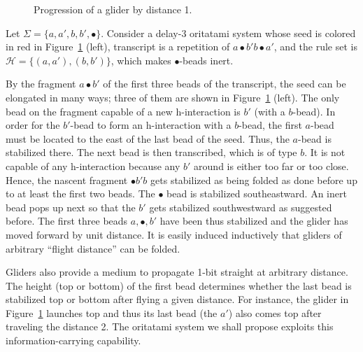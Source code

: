 \begin{figure}[htb]
{}
\caption{Progression of a glider by distance 1.}
\label{fig:glider}
\end{figure}


\begin{example}\label{ex:glider}
Let $\Sigma = \{a, a', b, b', \bullet\}$. 
Consider a delay-3 oritatami system whose seed is colored in red in Figure~\ref{fig:glider} (left), transcript is a repetition of $a \bullet b' b \bullet a'$, and the rule set is $\mathcal{H} = \{(a, a'), (b, b')\}$, which makes $\bullet$-beads inert. 

By the fragment $a \bullet b'$ of the first three beads of the transcript, the seed can be elongated in many ways; three of them are shown in Figure~\ref{fig:glider} (left). 
The only bead on the fragment capable of a new h-interaction is $b'$ (with a $b$-bead).
In order for the $b'$-bead to form an h-interaction with a $b$-bead, the first $a$-bead must be located to the east of the last bead of the seed. 
Thus, the $a$-bead is stabilized there. 
The next bead is then transcribed, which is of type $b$.
It is not capable of any h-interaction because any $b'$ around is either too far or too close.  
Hence, the nascent fragment $\bullet b' b$ gets stabilized as being folded as done before up to at least the first two beads. 
The $\bullet$ bead is stabilized southeastward. 
An inert bead pops up next so that the $b'$ gets stabilized southwestward as suggested before. 
The first three beads $a, \bullet, b'$ have been thus stabilized and the glider has moved forward by unit distance. 
It is easily induced inductively that gliders of arbitrary ``flight distance'' can be folded. 


Gliders also provide a medium to propagate 1-bit straight at arbitrary distance. 
The height (top or bottom) of the first bead determines whether the last bead is stabilized top or bottom after flying a given distance.
For instance, the glider in Figure~\ref{fig:glider} launches top and thus its last bead (the $a'$) also comes top after traveling the distance 2.
The oritatami system we shall propose exploits this information-carrying capability.
\end{example}


